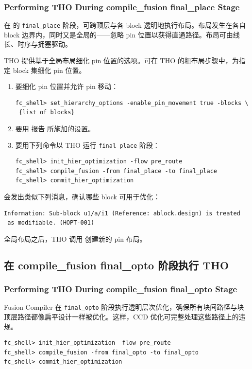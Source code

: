 \subsubsection*{Performing THO During compile\_fusion final\_place Stage}

在  的 \texttt{final\_place} 阶段，可跨顶层与各 block 透明地执行布局。布局发生在各自 block 边界内，同时又是全局的——忽略 pin 位置以获得直通路径。布局可由线长、时序与拥塞驱动。

THO 提供基于全局布局细化 pin 位置的选项。可在 THO 的粗布局步骤中，为指定 block 集细化 pin 位置。
\begin{enumerate}
  \item 要细化 pin 位置并允许 pin 移动：
\begin{lstlisting}
fc_shell> set_hierarchy_options -enable_pin_movement true -blocks \
 {list of blocks}
\end{lstlisting}
  \item 要用  报告  所施加的设置。
  \item 要用下列命令以 THO 运行 \texttt{final\_place} 阶段：
\begin{lstlisting}
fc_shell> init_hier_optimization -flow pre_route
fc_shell> compile_fusion -from final_place -to final_place
fc_shell> commit_hier_optimization
\end{lstlisting}
\end{enumerate}

 会发出类似下列消息，确认哪些 block 可用于优化：
\begin{lstlisting}
Information: Sub-block u1/a/i1 (Reference: ablock.design) is treated
 as modifiable. (HOPT-001)
\end{lstlisting}

全局布局之后，THO 调用  创建新的 pin 布局。

\subsection{在 compile\_fusion final\_opto 阶段执行 THO}
\subsubsection*{Performing THO During compile\_fusion final\_opto Stage}

Fusion Compiler 在 \texttt{final\_opto} 阶段执行透明层次优化，确保所有块间路径与块-顶层路径都像扁平设计一样被优化。这样，CCD 优化可完整处理这些路径上的违规。
\begin{lstlisting}
fc_shell> init_hier_optimization -flow pre_route
fc_shell> compile_fusion -from final_opto -to final_opto
fc_shell> commit_hier_optimization
\end{lstlisting}

